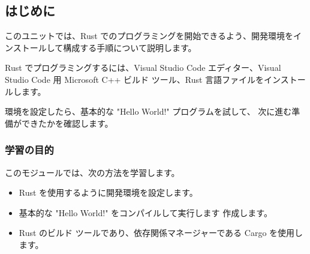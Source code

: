 \subsection{はじめに}

このユニットでは、Rust でのプログラミングを開始できるよう、開発環境をインストールして構成する手順について説明します。

Rust でプログラミングするには、Visual Studio Code エディター、Visual Studio Code 用 Microsoft C++ ビルド ツール、Rust 言語ファイルをインストールします。

環境を設定したら、基本的な "Hello World!" プログラムを試して、 次に進む準備ができたかを確認します。

\subsubsection{学習の目的}

このモジュールでは、次の方法を学習します。

\begin{itemize}
\item Rust を使用するように開発環境を設定します。
\item 基本的な "Hello World!" をコンパイルして実行します 作成します。
\item Rust のビルド ツールであり、依存関係マネージャーである Cargo を使用します。
\end{itemize}
